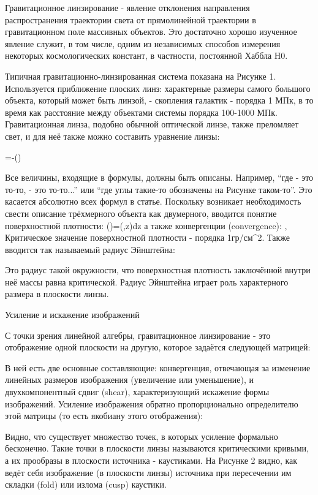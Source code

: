 Гравитационное линзирование - явление отклонения направления распространения траектории света от прямолинейной траектории в гравитационном поле массивных объектов. Это достаточно хорошо изученное явление служит, в том числе, одним из независимых способов измерения некоторых космологических констант, в частности, постоянной Хаббла H0. 

Типичная гравитационно-линзированная система показана на Рисунке 1. Используется приближение плоских линз: характерные размеры самого большого объекта, который может быть линзой, - скопления галактик - порядка 1 МПк, в то время как расстояние между объектами системы порядка 100-1000 МПк. 
Гравитационная линза, подобно обычной оптической линзе, также преломляет свет, и для неё также можно составить уравнение линзы:

=-()

Все величины, входящие в формулы, должны быть описаны. Например, “где \beta - это то-то, \theta - это то-то...” или “где углы такие-то обозначены на Рисунке таком-то”. Это касается абсолютно всех формул в статье. 
Поскольку возникает необходимость свести описание трёхмерного объекта как двумерного, вводится понятие поверхностной плотности:
()=(,z)dz
а также конвергенции (convergence):
, 
Критическое значение поверхностной плотности - порядка 1гр/см^2. Также вводится так называемый радиус Эйнштейна:

Это радиус такой окружности, что поверхностная плотность заключённой внутри неё массы равна критической. Радиус Эйнштейна играет роль характерного размера в плоскости линзы.

Усиление и искажение изображений

С точки зрения линейной алгебры, гравитационное линзирование - это отображение одной плоскости на другую, которое задаётся следующей матрицей:

В ней есть две основные составляющие: конвергенция, отвечающая за изменение линейных размеров изображения (увеличение или уменьшение), и двухкомпонентный сдвиг (shear), характеризующий искажение формы изображений. Усиление изображения обратно пропорционально определителю этой матрицы (то есть якобиану этого отображения):

Видно, что существует множество точек, в которых усиление формально бесконечно. Такие точки в плоскости линзы называются критическими кривыми, а их прообразы в плоскости источника - каустиками. На Рисунке 2 видно, как ведёт себя изображение (в плоскости линзы) источника при пересечении им складки (fold) или излома (cusp) каустики.

